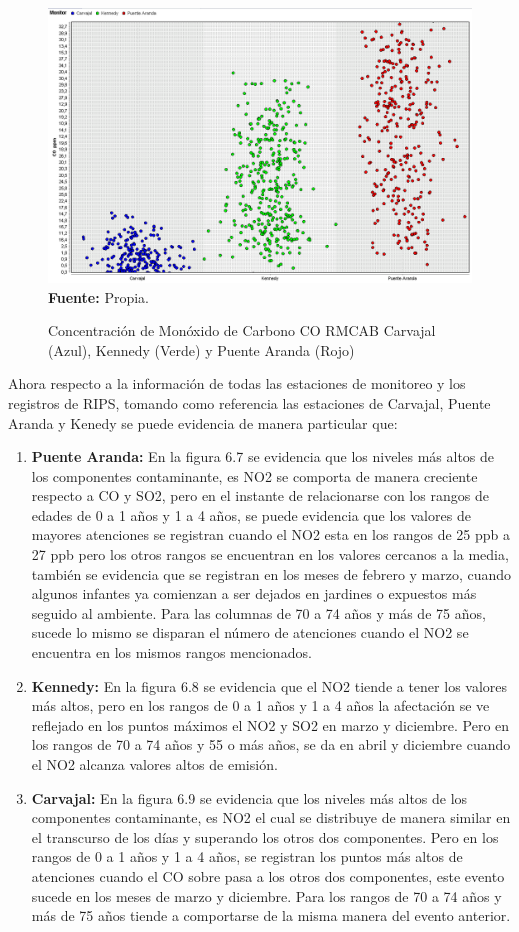 \documentclass[a4paper,openright,12pt]{book}
\theoremstyle{definition}
\theoremstyle{remark}
\begin{document}
\begin{figure}[h]
\centering
\caption{Concentración de Monóxido de Carbono CO RMCAB Carvajal (Azul), Kennedy (Verde) y Puente Aranda (Rojo)} 
\includegraphics[scale=0.45]{RMCABanalisis/AnalisisRMCABCO}
\label{fig:Tabla1}
\\ \textbf{Fuente: }Propia.
\end{figure}
Ahora respecto a la información de todas las estaciones de monitoreo y los registros de RIPS, tomando como referencia las estaciones de Carvajal, Puente Aranda y Kenedy se puede evidencia de manera particular que:
\begin{enumerate}
	\item \textbf{Puente Aranda:} En la figura 6.7 se evidencia que los niveles más altos de los componentes contaminante, es NO2 se comporta de manera creciente respecto a CO y SO2, pero en el instante de relacionarse con los rangos de edades de 0 a 1 años y 1 a 4 años, se puede evidencia que los valores de mayores atenciones se registran cuando el NO2 esta en los rangos de 25 ppb a 27 ppb pero los otros rangos se encuentran en los valores cercanos a la media, también se evidencia que se registran en los meses de febrero y marzo, cuando algunos infantes ya comienzan a ser dejados en jardines o expuestos más seguido al ambiente. Para las columnas de 70 a 74 años y más de 75 años, sucede lo mismo se disparan el número de atenciones cuando el NO2 se encuentra en los mismos rangos mencionados.
    \item \textbf{Kennedy:} En la figura 6.8 se evidencia que el NO2 tiende a tener los valores más altos, pero en los rangos de 0 a 1 años y 1 a 4 años la afectación se ve reflejado en los puntos máximos el NO2 y SO2 en marzo y diciembre. Pero en los rangos de 70 a 74 años y 55 o más años, se da en abril y diciembre cuando el NO2 alcanza valores altos de emisión.
    \item \textbf{Carvajal:} En la figura 6.9 se evidencia que los niveles más altos de los componentes contaminante, es NO2 el cual se distribuye de  manera similar en el transcurso de los días y superando los otros dos componentes. Pero en los rangos de 0 a 1 años y 1 a 4 años, se registran los puntos más altos de atenciones cuando el CO sobre pasa a los otros dos componentes, este evento sucede en los meses de marzo y diciembre. Para los rangos de 70 a 74 años y más de 75 años tiende a comportarse de la misma manera del evento anterior.
\end{enumerate}
\end{document}
